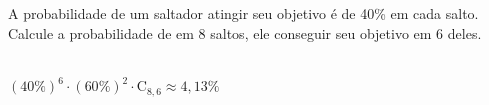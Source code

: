\begin{ex}
A probabilidade de um saltador atingir seu objetivo é de 40\% em cada salto. Calcule a probabilidade de em 8 saltos, ele conseguir seu objetivo em 6 deles.
 \begin{sol}
  \phantom{A} \\
  $(40\%)^6\cdot(60\%)^2\cdot\mathrm{C}_{8,6}\approx 4,13\%$
 \end{sol}
\end{ex}